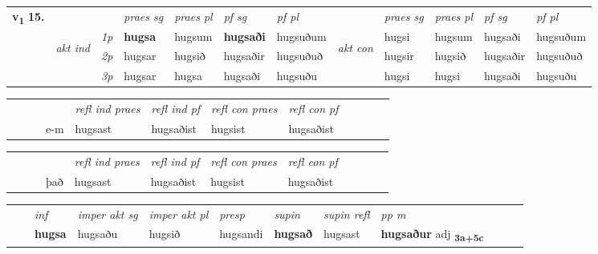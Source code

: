 \begin{tabular}{llllllllllll} \toprule
\multirow{4}{*}{{{\textbf{v{\textsubscript{1}}} \Large{\textbf{15.}}}}}  & &   &  \textit{praes sg}  & \textit{praes pl}  &\textit{ pf sg} & \textit{pf pl} &  &  \textit{praes sg}  & \textit{praes pl}  & \textit{pf sg} & \textit{pf pl } \\*
	\cmidrule{4-7} \cmidrule{9-12}
 & \multirow{3}{*}{\begin{turn}{90}\textit{akt ind}\end{turn}} & {\textit{1p}} & \textbf{hugsa} & hugsum    & \textbf{hugsaði} & hugsuðum & \multirow{3}{*}{\begin{turn}{90}\textit{akt con}\end{turn}} &hugsi & hugsum & hugsaði & hugsuðum\\*
& &  {\textit{2p}} &  hugsar  & hugsið   & hugsaðir & hugsuðuð & & hugsir & hugsið & hugsaðir & hugsuðuð \\*
& &  {\textit{3p}} & hugsar & hugsa   & hugsaði & hugsuðu & & hugsi & hugsi& hugsaði & hugsuðu  \\*
\cmidrule{4-7} \cmidrule{9-12}
\end{tabular}


\begin{tabular}{llllllllllll}
 & &  & &  \textit{refl ind praes} & \textit{refl ind pf} & \textit{refl con praes} & \textit{refl con pf} \\*
&  & & e-m & hugsast & hugsaðist & hugsist & hugsaðist \\*
\cmidrule{5-9}
\end{tabular}


\begin{tabular}{llllllllllll}
 & &  & &  \textit{refl ind praes} & \textit{refl ind pf} & \textit{refl con praes} & \textit{refl con pf} \\*
 & &  & það & hugsast & hugsaðist & hugsist & hugsaðist \\*
\cmidrule{5-9}
\end{tabular}


\begin{tabular}{llllllllllll}
 & & \textit{inf} & \textit{imper akt sg} & \textit{imper akt pl}   & \textit{presp} & \textit{supin} & \textit{supin refl} & \textit{pp m}     \\*
  & & \textbf{hugsa} & hugsaðu  & hugsið   & hugsandi &  \textbf{hugsað} & hugsast & \textbf{hugsaður} adj \textbf{\textsubscript{3a+5c}} \\*
\cmidrule{1-12}
\end{tabular}



